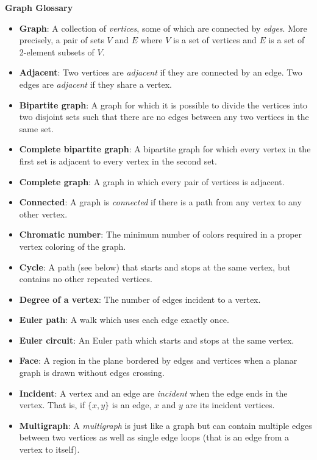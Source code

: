 \documentclass[10pt]{exam}
\begin{document}
\newpage

\centerline{\textbf{Graph Glossary}}
\begin{itemize}
    \item[] \textbf{Graph}: A collection of {\em vertices}, some of which are connected by {\em edges}.  More precisely, a pair of sets $V$ and $E$ where $V$ is a set of vertices and $E$ is a set of 2-element subsets of $V$.
    \item[] \textbf{Adjacent}: Two vertices are {\em adjacent} if they are connected by an edge.  Two edges are {\em adjacent} if they share a vertex.
    \item[] \textbf{Bipartite graph}: A graph for which it is possible to divide the vertices into two disjoint sets such that there are no edges between any two vertices in the same set.
    \item[] \textbf{Complete bipartite graph}: A bipartite graph for which every vertex in the first set is adjacent to every vertex in the second set.
    \item[] \textbf{Complete graph}: A graph in which every pair of vertices is adjacent.
    \item[] \textbf{Connected}: A graph is {\em connected} if there is a path from any vertex to any other vertex.
    \item[] \textbf{Chromatic number}: The minimum number of colors required in a proper vertex coloring of the graph.
    \item[] \textbf{Cycle}: A path (see below) that starts and stops at the same vertex, but contains no other repeated vertices.
    \item[] \textbf{Degree of a vertex}: The number of edges incident to a vertex.
    \item[] \textbf{Euler path}: A walk which uses each edge exactly once.
    \item[] \textbf{Euler circuit}: An Euler path which starts and stops at the same vertex.
    \item[] \textbf{Face}: A region in the plane bordered by edges and vertices when a planar graph is drawn without edges crossing.
		\item[] \textbf{Incident}: A vertex and an edge are \emph{incident} when the edge ends in the vertex.  That is, if $\{x,y\}$ is an edge, $x$ and $y$ are its incident vertices.
    \item[] \textbf{Multigraph}: A {\em multigraph} is just like a graph but can contain multiple edges between two vertices as well as single edge loops (that is an edge from a vertex to itself).

\end{itemize}
\end{document}
